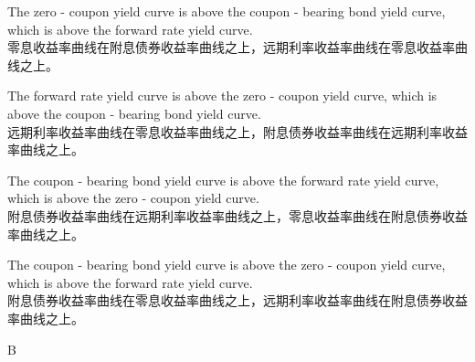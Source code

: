 \documentclass{article}
\begin{document}
    \begin{choices}
        \item The zero - coupon yield curve is above the coupon - bearing bond yield curve, which is above the forward rate yield curve.\\
        零息收益率曲线在附息债券收益率曲线之上，远期利率收益率曲线在零息收益率曲线之上。
        \item The forward rate yield curve is above the zero - coupon yield curve, which is above the coupon - bearing bond yield curve.\\
        远期利率收益率曲线在零息收益率曲线之上，附息债券收益率曲线在远期利率收益率曲线之上。
        \item The coupon - bearing bond yield curve is above the forward rate yield curve, which is above the zero - coupon yield curve.\\
        附息债券收益率曲线在远期利率收益率曲线之上，零息收益率曲线在附息债券收益率曲线之上。
        \item The coupon - bearing bond yield curve is above the zero - coupon yield curve, which is above the forward rate yield curve.\\
        附息债券收益率曲线在零息收益率曲线之上，远期利率收益率曲线在附息债券收益率曲线之上。
    \end{choices}
    
    \begin{correctanswer}
        B
    \end{correctanswer}
    
\end{document}
